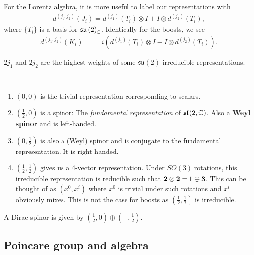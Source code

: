 For the Lorentz algebra, it is more useful to label our representations with
\begin{align}
    d^{\left( j_1,j_2 \right) }\left( J_{i} \right) = d^{\left( j_1 \right) }\left( T_i \right) \otimes I + I \otimes d^{\left( j_2 \right) }\left( T_i \right) 
,\end{align}
where $\{T_i\} $ is a basis for $\mathfrak{su}\left( 2 \right)_{\mathbb{C}}$. Identically for the boosts, we see
\begin{align}
    d^{\left( j_1,j_2 \right) }\left( K_{i} \right) = =i \left(  d^{\left( j_1 \right) }\left( T_i \right) \otimes I - I \otimes d^{\left( j_2 \right) }\left( T_i \right)  \right) 
.\end{align}

$2j_1$ and $2j_2$ are the highest weights of some $\mathfrak{su}\left( 2 \right) $ irreducible representations.

\begin{examples}~
    \begin{enumerate}[label=\alph*)]
        \item $\left( 0,0 \right) $ is the trivial representation corresponding to scalars.
        \item $\left( \frac{1}{2},0 \right) $ is a spinor: The \textit{fundamental representation} of $\mathfrak{sl}\left( 2,\mathbb{C} \right) $. Also a \textbf{Weyl spinor} and is left-handed.
        \item $\left( 0,\frac{1}{2} \right) $ is also a (Weyl) spinor and is conjugate to the fundamental representation. It is right handed.
        \item $\left( \frac{1}{2},\frac{1}{2} \right) $ gives us a 4-vector representation. Under $SO \left( 3 \right) $ rotations, this irreducible representation is reducible such that $\vb{2} \otimes \vb{2} = \vb{1} \oplus \vb{3}$. This can be thought of as $\left( x^{0}, x^{i} \right) $ where $x^{0}$ is trivial under such rotations and $x^{i}$ obviously mixes. This is not the case for boosts as $\left( \frac{1}{2},\frac{1}{2} \right) $ is irreducible.
    \end{enumerate}
\end{examples}

\begin{note}
    A Dirac spinor is given by $\left( \frac{1}{2}, 0 \right) \oplus \left( -,\frac{1}{2} \right) $.
\end{note}

\subsection{Poincare group and algebra}

